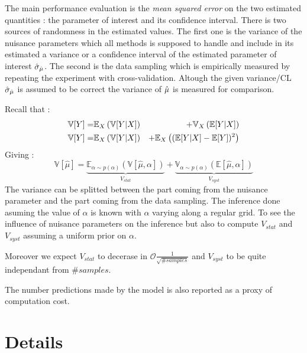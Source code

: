 The main performance evaluation is the \emph{mean squared error} on the two estimated quantities : the parameter of interest and its confidence interval.
There is two sources of randomness in the estimated values.
The first one is the variance of the nuisance parameters which all methods is supposed to handle and include in its estimated a variance or a confidence interval of the estimated parameter of interest $\hat\sigma_{\hat\mu}$.
The second is the data sampling which is empirically measured by repeating the experiment with cross-validation.
Altough the given variance/CL $\hat\sigma_{\hat\mu}$ is assumed to be correct the variance of $\hat\mu$ is measured for comparison.


Recall that :
\begin{eqnarray}
\label{eq:total_variance_law_2}
    \mathbb{V}[Y] =& \mathbb{E}_X \left (\mathbb{V}[Y|X] \right ) &+ \mathbb{V}_X \left (\mathbb{E}[Y|X]\right ) \\
    \mathbb{V}[Y] =& \mathbb{E}_X \left (\mathbb{V}[Y|X] \right ) &+ \mathbb{E}_X \left ( (\mathbb{E} [Y|X]  - \mathbb{E}[Y])^2\right )
\end{eqnarray}
Giving :
\begin{equation}
\label{eq:stat_and_syst_variance_definition_2}
\mathbb{V}[\hat \mu] 
	= \underbrace{\mathbb{E}_{\alpha \sim p(\alpha)} \left (\mathbb{V}[\hat \mu, \alpha] \right )}_{V_{stat}} 
	+ \underbrace{\mathbb{V}_{\alpha \sim p(\alpha)} \left ( \mathbb{E} [\hat \mu, \alpha] \right )}_{V_{syst}}
\end{equation}
The variance can be splitted between the part coming from the nuisance parameter and the part coming from the data sampling.
The inference done asuming the value of $\alpha$ is known with $\alpha$ varying along a regular grid.
To see the influence of nuisance parameters on the inference but also to compute $V_{stat}$ and $V_{syst}$ assuming a uniform prior on $\alpha$.

Moreover we expect $V_{stat}$ to decerase in $\mathcal O \frac{1}{\sqrt{\#samples}}$ and $V_{syst}$ to be quite independant from $\#samples$.

The number predictions made by the model is also reported as a proxy of computation cost.



\section{Details} %
\label{sec:details}

